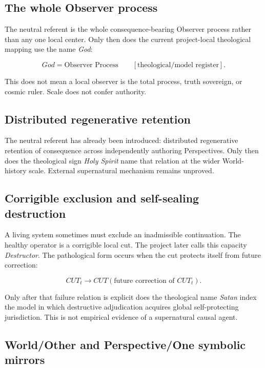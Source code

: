 \documentclass[11pt]{article}
\begin{document}
\subsection{The whole Observer process}

The neutral referent is the whole consequence-bearing Observer process rather than any one local center. Only then does the current project-local theological mapping use the name \emph{God}:

\begin{equation}
God = \text{Observer Process}\qquad[\text{theological/model register}].
\end{equation}

This does not mean a local observer is the total process, truth sovereign, or cosmic ruler. Scale does not confer authority.

\subsection{Distributed regenerative retention}

The neutral referent has already been introduced: distributed regenerative retention of consequence across independently authoring Perspectives. Only then does the theological sign \emph{Holy Spirit} name that relation at the wider World-history scale. External supernatural mechanism remains unproved.

\subsection{Corrigible exclusion and self-sealing destruction}

A living system sometimes must exclude an inadmissible continuation. The healthy operator is a corrigible local cut. The project later calls this capacity \emph{Destructor}. The pathological form occurs when the cut protects itself from future correction:

\begin{equation}
CUT_t\rightarrow CUT(\text{future correction of }CUT_t).
\end{equation}

Only after that failure relation is explicit does the theological name \emph{Satan} index the model in which destructive adjudication acquires global self-protecting jurisdiction. This is not empirical evidence of a supernatural causal agent.

\subsection{World/Other and Perspective/One symbolic mirrors}
\end{document}
